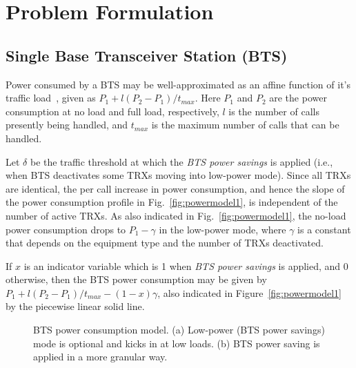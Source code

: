 \section{Problem Formulation}
\label{sec:formulation}
\subsection{Single Base Transceiver Station (BTS)}
Power consumed by a BTS may be well-approximated as an affine function of it's traffic load~\cite{Peng:2011:BTSSaving:Mobicom}, given as
$P_1+l(P_2-P_1)/t_{max}$. Here $P_1$ and $P_2$ are the power
consumption at no load and full load, respectively, $l$ is the
number of calls presently being handled, and $t_{max}$ is the
maximum number of calls that can be handled.

Let $\delta$ be the traffic threshold at which the \textit{BTS
power savings} is applied (i.e., when BTS deactivates some TRXs
moving into low-power mode). Since all TRXs are identical, the
per call increase in power consumption, and hence the slope of
the power consumption profile in Fig.~\ref{fig:powermodel1},
is independent of the number of active TRXs. As
also indicated in Fig.~\ref{fig:powermodel1}, the no-load power
consumption drops to $P_1-\gamma$ in the low-power mode, where
$\gamma$ is a constant that depends on the equipment type and
the number of TRXs deactivated.

If $x$ is an indicator variable which is 1 when \textit{BTS
power savings} is applied, and $0$ otherwise, then the BTS
power consumption may be given by $P_1+l(P_2-P_1)/t_{max} -
(1-x)\gamma$, also indicated in Figure~\ref{fig:powermodel1} by
the piecewise linear solid line.

\begin{figure}
\centering
{}
\caption{BTS power consumption model. (a) Low-power (BTS power savings) mode is optional and kicks in at low loads. (b) BTS power saving is applied in a more granular way.} 
\label{fig:trafficmodelstats}
\end{figure}

